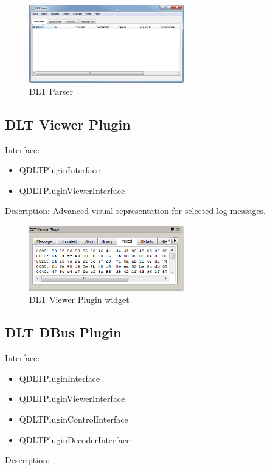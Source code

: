 \documentclass[a4paper,11pt]{article}
\begin{document}
\begin{figure}[H]
 \centering
 \includegraphics[width=0.6\textwidth]{images/dlt_parser.png}
 \caption{DLT Parser}
 \label{fig:dltparser}
\end{figure}




\subsection{DLT Viewer Plugin}

Interface:
\begin{itemize}
   \item  QDLTPluginInterface
   \item  QDLTPluginViewerInterface
\end{itemize}

Description:
    Advanced visual representation for selected log messages.
\linebreak

\begin{figure}[H]
 \centering
 \includegraphics[width=0.6\textwidth]{images/viewer_plugin.png}
 \caption{DLT Viewer Plugin widget}
 \label{fig:viewerpluginwidget}
\end{figure}


\subsection{DLT DBus Plugin}

Interface:
\begin{itemize}
    \item QDLTPluginInterface
    \item QDLTPluginViewerInterface
    \item QDLTPluginControlInterface
    \item QDLTPluginDecoderInterface
\end{itemize}
Description:\linebreak
\end{document}
